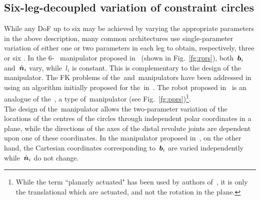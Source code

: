 \documentclass[DD]{iitmdiss}
\newcommand{\mref}[1]{\ref{#1}}
\newcommand{\mcite}[1]{\cite{#1}}
\newcommand{\mlabel}[1]{\label{#1}}
\begin{document}
\subsection{Six-\dofs leg-decoupled variation of constraint circles}\mlabel{sc:6decoupled}
%
While any DoF up to six may be achieved by varying the appropriate parameters in the above description, many common architectures use single-parameter variation of either one or two parameters in each leg to obtain, respectively, three or six \dofs. In the 6-\dofs~\mbox{\rprs} manipulator proposed in~\mcite{venkatesan2014} (shown in Fig.~\mref{fg:rprs}), both~$\bm{b}_i$ and~$\hat{\bm{n}}_i$ vary, while~$l_i$ is constant. This is complementary to the design of the\mbox{~\rps} manipulator. The FK problems of the~\rrs and~\rprs manipulators have been addressed in~\mcite{pavanddp} using an algorithm initially proposed for the~\rps in~\mcite{tk2017a}. The robot proposed in~\mcite{benhorin1998} is an analogue of the~\rprs, a type of~\pprs manipulator (see Fig.~\mref{fg:pprs})\footnote{While the term ``planarly actuated" has been used by authors of~\mcite{benhorin1998}, it is only the translational \dofs which are actuated, and not the rotation in the plane.}. \\
The design of the~\rprs manipulator allows the two-parameter variation of the locations of the centres of the circles through independent polar coordinates in a plane, while the directions of the axes of the distal revolute joints are dependent upon one of these coordinates. In the manipulator proposed in~\mcite{benhorin1998}, on the other hand, the Cartesian coordinates corresponding to~$\bm{b}_i$ are varied independently while~$\hat{\bm{n}}_i$ do not change.
\end{document}
